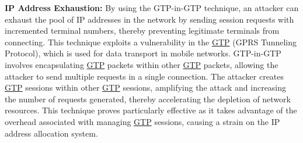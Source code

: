 \documentclass[english]{article}
\begin{document}
\textbf{IP Address Exhaustion:} By using the GTP-in-GTP technique, an attacker can exhaust
the pool of IP addresses in the network by sending session requests with incremented terminal numbers,
thereby preventing legitimate terminals from connecting. This technique exploits a vulnerability
in the \hyperlink{GTP}{GTP} (GPRS Tunneling Protocol), which is used for data transport in mobile networks.
GTP-in-GTP involves encapsulating \hyperlink{GTP}{GTP} packets within other \hyperlink{GTP}{GTP} packets, allowing the attacker
to send multiple requests in a single connection. The attacker creates \hyperlink{GTP}{GTP} sessions within other
\hyperlink{GTP}{GTP} sessions, amplifying the attack and increasing the number of requests generated, thereby
accelerating the depletion of network resources. This technique proves particularly effective
as it takes advantage of the overhead associated with managing \hyperlink{GTP}{GTP} sessions, causing a strain
on the IP address allocation system.\@
\\[0.2cm]
\end{document}
